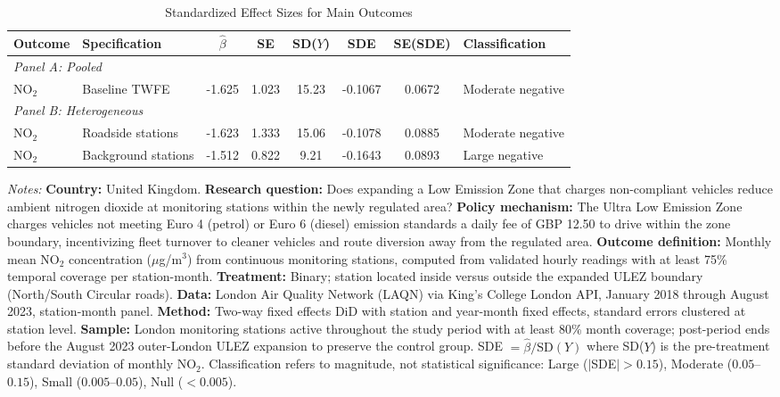\begin{table}[H]
\centering
\caption{Standardized Effect Sizes for Main Outcomes}
\label{tab:sde}
\begin{threeparttable}
\footnotesize
\begin{tabular}{llcccccl}
\toprule
Outcome & Specification & $\hat{\beta}$ & SE & SD($Y$) & SDE & SE(SDE) & Classification \\
\midrule
\multicolumn{8}{l}{\textit{Panel A: Pooled}} \\
NO$_2$ & Baseline TWFE & -1.625 & 1.023 & 15.23 & -0.1067 & 0.0672 & Moderate negative \\
\midrule
\multicolumn{8}{l}{\textit{Panel B: Heterogeneous}} \\
NO$_2$ & Roadside stations & -1.623 & 1.333 & 15.06 & -0.1078 & 0.0885 & Moderate negative \\
NO$_2$ & Background stations & -1.512 & 0.822 & 9.21 & -0.1643 & 0.0893 & Large negative \\
\bottomrule
\end{tabular}
\begin{tablenotes}[flushleft]
\scriptsize\sloppy
\item \textit{Notes:} \textbf{Country:} United Kingdom. \textbf{Research question:} Does expanding a Low Emission Zone that charges non-compliant vehicles reduce ambient nitrogen dioxide at monitoring stations within the newly regulated area? \textbf{Policy mechanism:} The Ultra Low Emission Zone charges vehicles not meeting Euro 4 (petrol) or Euro 6 (diesel) emission standards a daily fee of GBP 12.50 to drive within the zone boundary, incentivizing fleet turnover to cleaner vehicles and route diversion away from the regulated area. \textbf{Outcome definition:} Monthly mean NO$_2$ concentration ($\mu$g/m$^3$) from continuous monitoring stations, computed from validated hourly readings with at least 75\% temporal coverage per station-month. \textbf{Treatment:} Binary; station located inside versus outside the expanded ULEZ boundary (North/South Circular roads). \textbf{Data:} London Air Quality Network (LAQN) via King's College London API, January 2018 through August 2023, station-month panel. \textbf{Method:} Two-way fixed effects DiD with station and year-month fixed effects, standard errors clustered at station level. \textbf{Sample:} London monitoring stations active throughout the study period with at least 80\% month coverage; post-period ends before the August 2023 outer-London ULEZ expansion to preserve the control group. SDE $= \hat{\beta} / \text{SD}(Y)$ where SD($Y$) is the pre-treatment standard deviation of monthly NO$_2$. Classification refers to magnitude, not statistical significance: Large ($|$SDE$| > 0.15$), Moderate ($0.05$--$0.15$), Small ($0.005$--$0.05$), Null ($< 0.005$).
\end{tablenotes}
\end{threeparttable}
\end{table}
